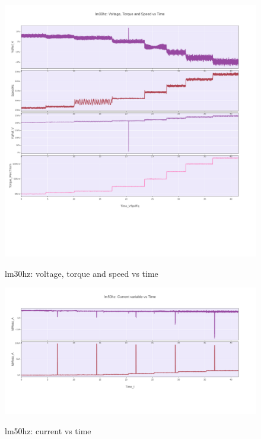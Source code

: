 \documentclass[paper=a4, fontsize=11pt]{scrartcl} %
\numberwithin{equation}{section} %
\numberwithin{figure}{section} %
\numberwithin{table}{section} %
\begin{document}
  \begin{figure}[H]
    \centering
      \href{https://plot.ly/~versag/36/#/}{\includegraphics[width=1\linewidth]{lm30hz_voltage_torque_speed_vs_time}}
        \caption{lm30hz: voltage, torque and speed vs time}
  \end{figure}

  \begin{figure}[H]
    \centering
      \href{https://plot.ly/~versag/38/#/}{\includegraphics[width=1\linewidth]{lm50hz_current_vs_time}}
        \caption{lm50hz: current vs time}
  \end{figure}
\end{document}

